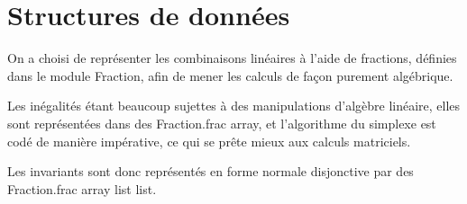 \documentclass[a4paper]{article}
\begin{document}
\section{Structures de données}

On a choisi de représenter les combinaisons linéaires à l'aide de fractions, définies dans le module Fraction, afin de mener les calculs de façon purement algébrique.

Les inégalités étant beaucoup sujettes à des manipulations d'algèbre linéaire, elles sont représentées dans des Fraction.frac array, et l'algorithme du simplexe est codé de manière impérative, ce qui se prête mieux aux calculs matriciels.

Les invariants sont donc représentés en forme normale disjonctive par des Fraction.frac array list list.
\end{document}
